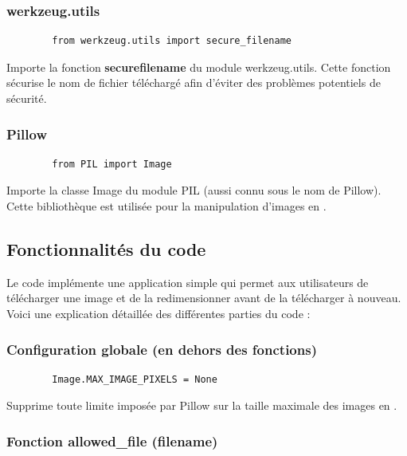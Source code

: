         \subsubsection{werkzeug.utils}

        \begin{lstlisting}
        from werkzeug.utils import secure_filename
        \end{lstlisting}
        
        Importe la fonction \textbf{secure}\textunderscore\textbf{filename} du module werkzeug.utils. Cette fonction sécurise le nom de fichier téléchargé afin d'éviter des problèmes potentiels de sécurité.

        \subsubsection{Pillow}
        
        \begin{lstlisting}
        from PIL import Image
        \end{lstlisting}
        
        Importe la classe Image du module PIL (aussi connu sous le nom de Pillow). Cette bibliothèque est utilisée pour la manipulation d'images en \py.
        
        \subsection{Fonctionnalités du code}
        Le code \py implémente une application  simple qui permet aux utilisateurs de télécharger une image et de la redimensionner avant de la télécharger à nouveau. Voici une explication détaillée des différentes parties du code :
        
        \subsubsection{Configuration globale (en dehors des fonctions)}

        \begin{lstlisting}
        Image.MAX_IMAGE_PIXELS = None
        \end{lstlisting}
        
        Supprime toute limite imposée par Pillow sur la taille maximale des images en .
        
        \subsubsection{Fonction \textbf{allowed\_file} (filename)}
        
